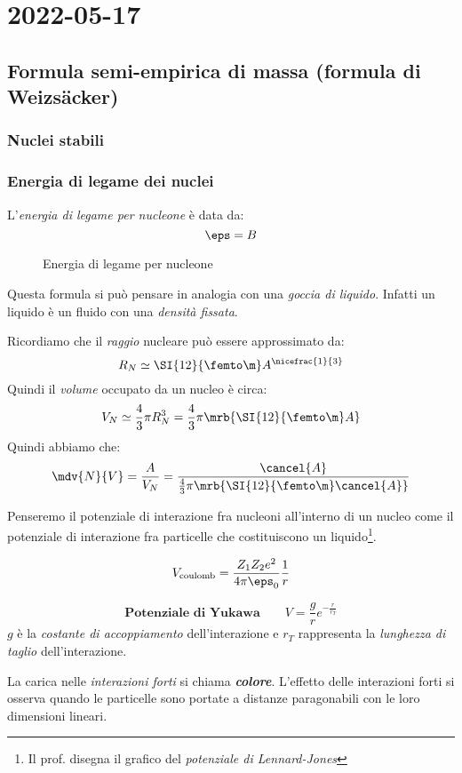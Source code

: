 \chapter{2022-05-17}
\section{Formula semi-empirica di massa (formula di Weizsäcker)}
\subsection{Nuclei stabili}

\subsection{Energia di legame dei nuclei}
L'\textit{energia di legame per nucleone} è data da:
\[
  \eps = B 
\]
\begin{figure}[ht]
  \centering
  \caption{Energia di legame per nucleone}
  \label{fig:binding_energy}
\end{figure}


\begin{note}[]
  Questa formula si può pensare in analogia con una \textit{goccia di liquido}.
  Infatti un liquido è un fluido con una \textit{densità fissata}.
\end{note}

Ricordiamo che il \textit{raggio} nucleare può essere approssimato da:
\[
  R_N \simeq \SI{12}{\femto\m} A ^{\nicefrac{1}{3}}
\]
Quindi il \textit{volume} occupato da un nucleo è circa:
\[
  V_N \simeq \frac{4}{3} \pi R_N^3 = \frac{4}{3} \pi \mrb{\SI{12}{\femto\m} A}
\]
Quindi abbiamo che:
\[
  \mdv{N}{V} = \frac{A}{V_N} = \frac{\cancel{A}}{\frac{4}{3} \pi
  \mrb{\SI{12}{\femto\m} \cancel{A}}}
\]

Penseremo il potenziale di interazione fra nucleoni all'interno di un nucleo
come il potenziale di interazione fra particelle che costituiscono un
liquido\footnote{
  Il prof. disegna il grafico del \textit{potenziale di Lennard-Jones}
}.

\[
  V_\text{coulomb} = \frac{Z_1 Z_2 e^2}{4 \pi \eps_0} \frac{1}{r}
\]

\[
  \textbf{Potenziale di Yukawa}\qquad
  \boxed{
    V = \frac{g}{r} e^{- \frac{r}{r_T}}
  }
\]
$g$ è la \textit{costante di accoppiamento} dell'interazione e $r_T$
rappresenta la \textit{lunghezza di taglio} dell'interazione.
\begin{note}[]
  La carica nelle \textit{interazioni forti} si chiama \textit{\textbf{colore}}.
  L'effetto delle interazioni forti si osserva quando le particelle sono portate
  a distanze paragonabili con le loro dimensioni lineari.
\end{note}

